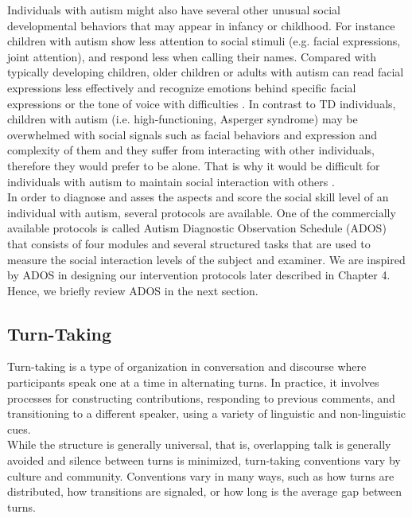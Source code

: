 Individuals with autism might also have several other unusual social developmental
behaviors that may appear in infancy or childhood. For instance children with autism show
less attention to social stimuli (e.g. facial expressions, joint attention), and respond less
when calling their names. Compared with typically developing children, older children or
adults with autism can read facial expressions less effectively and recognize emotions
behind specific facial expressions or the tone of voice with difficulties \cite{LogicScien1959}. In contrast to
TD individuals, children with autism (i.e. high-functioning, Asperger syndrome) may be
overwhelmed with social signals such as facial behaviors and expression and complexity
of them and they suffer from interacting with other individuals, therefore they would prefer
to be alone. That is why it would be difficult for individuals with autism to maintain social
interaction with others \cite{InfantileAutism1975}.\\

In order to diagnose and asses the aspects and score the social skill level of an individual
with autism, several protocols are available. One of the commercially available protocols
is called Autism Diagnostic Observation Schedule (ADOS) \cite{AutismDiagno1989} that consists of four
modules and several structured tasks that are used to measure the social interaction levels
of the subject and examiner. We are inspired by ADOS in designing our intervention
protocols later described in Chapter 4. Hence, we briefly review ADOS in the next section.\\


\subsection{Turn-Taking}
Turn-taking is a type of organization in conversation and discourse where participants speak 
one at a time in alternating turns. In practice, it involves processes for constructing 
contributions, responding to previous comments, and transitioning to a different speaker, 
using a variety of linguistic and non-linguistic cues.\cite{BehaviorlaStudy1964}\\


While the structure is generally universal,\cite{RoboticMovement} that is, overlapping talk is generally 
avoided and silence between turns is minimized, turn-taking conventions vary by culture 
and community.\cite{EnhanceEmpiri2011} Conventions vary in many ways, such as how turns are distributed, how 
transitions are signaled, or how long is the average gap between turns.\\


